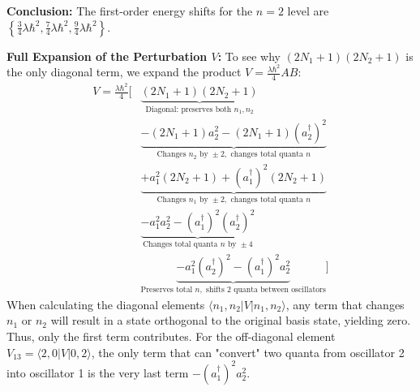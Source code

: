 \begin{solution}
\textbf{Conclusion:}
The first-order energy shifts for the $n=2$ level are $\left\{ \frac{3}{4}\lambda\hbar^2, \frac{7}{4}\lambda\hbar^2, \frac{9}{4}\lambda\hbar^2 \right\}$.

\begin{remark}
\textbf{Full Expansion of the Perturbation $V$:}
To see why $(2N_1+1)(2N_2+1)$ is the only diagonal term, we expand the product $V = \frac{\lambda\hbar^2}{4} AB$:
\[ \begin{aligned}
V = \frac{\lambda\hbar^2}{4} \Big[ & \underbrace{(2N_1+1)(2N_2+1)}_{\text{Diagonal: preserves both } n_1, n_2} \\
& \underbrace{- (2N_1+1)a_2^2 - (2N_1+1)(a_2^\dagger)^2}_{\text{Changes } n_2 \text{ by } \pm 2, \text{ changes total quanta } n} \\
& \underbrace{+ a_1^2(2N_2+1) + (a_1^\dagger)^2(2N_2+1)}_{\text{Changes } n_1 \text{ by } \pm 2, \text{ changes total quanta } n} \\
& \underbrace{- a_1^2 a_2^2 - (a_1^\dagger)^2 (a_2^\dagger)^2}_{\text{Changes total quanta } n \text{ by } \pm 4} \\
& \underbrace{- a_1^2 (a_2^\dagger)^2 - (a_1^\dagger)^2 a_2^2}_{\text{Preserves total } n, \text{ shifts } 2 \text{ quanta between oscillators}} \Big]
\end{aligned} \]
When calculating the diagonal elements $\langle n_1, n_2 | V | n_1, n_2 \rangle$, any term that changes $n_1$ or $n_2$ will result in a state orthogonal to the original basis state, yielding zero. Thus, only the first term contributes. For the off-diagonal element $V_{13} = \langle 2, 0 | V | 0, 2 \rangle$, the only term that can "convert" two quanta from oscillator 2 into oscillator 1 is the very last term $-(a_1^\dagger)^2 a_2^2$.
\end{remark}
\end{solution}

